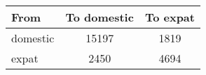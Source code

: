 \begin{tabular}{lcc}
\hline \hline
 From &  To domestic & To expat \\
\hline

domestic & 15197 & 1819 \\ 
expat & 2450 & 4694 \\ 
\hline \hline
\end{tabular}